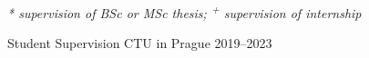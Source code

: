 

\cventry
    {\begin{small}\textit{* supervision of BSc or MSc thesis; \textsuperscript{+} supervision of internship}\end{small}} %
    {Student Supervision} %
    {CTU in Prague} %
    {2019--2023} %
    {
    }

